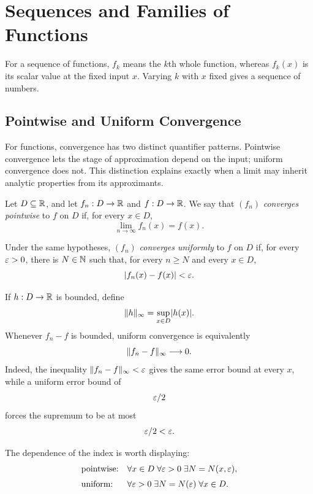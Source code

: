 \chapter{Sequences and Families of Functions}
\label{ch:function-sequences}

For a sequence of functions, $f_k$ means the $k$th whole function,
whereas $f_k(x)$ is its scalar value at the fixed input $x$. Varying $k$
with $x$ fixed gives a sequence of numbers.

\section{Pointwise and Uniform Convergence}

For functions, convergence has two distinct quantifier patterns.  Pointwise
convergence lets the stage of approximation depend on the input; uniform
convergence does not.  This distinction explains exactly when a limit may
inherit analytic properties from its approximants.

\begin{definition}
Let $D\subseteq\mathbb{R}$, and let $f_n:D\to\mathbb{R}$ and $f:D\to\mathbb{R}$. We say that $(f_n)$ \emph{converges pointwise} to $f$ on $D$ if, for every $x\in D$,
\[
\lim_{n\to\infty}f_n(x)=f(x).
\]
\end{definition}

\begin{definition}
\label{def:uniform-convergence}
Under the same hypotheses, $(f_n)$ \emph{converges uniformly} to $f$ on $D$ if, for every $\varepsilon>0$, there is $N\in\mathbb{N}$ such that, for every $n\geq N$ and every $x\in D$,
\[
\lvert f_n(x)-f(x)\rvert<\varepsilon.
\]
\end{definition}

\begin{definition}
If $h:D\to\mathbb{R}$ is bounded, define
\[
\lVert h\rVert_\infty=\sup_{x\in D}\lvert h(x)\rvert.
\]
Whenever $f_n-f$ is bounded, uniform convergence is equivalently
\[
\lVert f_n-f\rVert_\infty\longrightarrow0.
\]
Indeed, the inequality $\lVert f_n-f\rVert_\infty<\varepsilon$ gives the same error
bound at every $x$, while a uniform error bound of
\[
\varepsilon/2
\]
 forces the
supremum to be at most
\[
\varepsilon/2<\varepsilon.
\]

\end{definition}

The dependence of the index is worth displaying:
\[
\begin{array}{ll}
\text{pointwise:}&
\forall x\in D\;\forall\varepsilon>0\;\exists N=N(x,\varepsilon),\\[2mm]
\text{uniform:}&
\forall\varepsilon>0\;\exists N=N(\varepsilon)\;\forall x\in D.
\end{array}
\]

